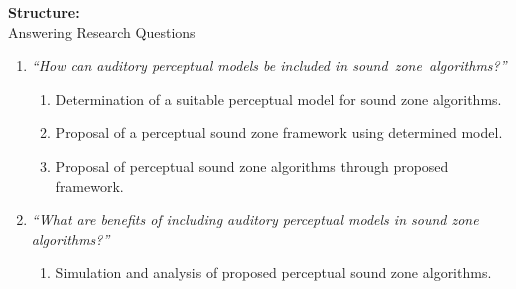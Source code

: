 \documentclass[aspectratio=169]{beamer}
\begin{document}
\begin{frame}{\textbf{Structure:}\\ Answering Research Questions}
    \begin{enumerate}
        \item {\textit{``How can auditory perceptual models be included in sound~zone~algorithms?''}}
            \vspace{7pt}
            \begin{enumerate}
                \item Determination of a suitable perceptual model for sound zone algorithms.
                \vspace{7pt}
                \item Proposal of a perceptual sound zone framework using determined model. 
                \vspace{7pt}
                \item Proposal of perceptual sound zone algorithms through proposed framework.
                \vspace{7pt}
            \end{enumerate}
        \item {\textit{``What are benefits of including auditory perceptual models in sound zone algorithms?''}}
            \vspace{-5pt}
            \begin{enumerate}
                \item Simulation and analysis of proposed perceptual sound zone algorithms.
            \end{enumerate}
    \end{enumerate}
\end{frame}
\end{document}
